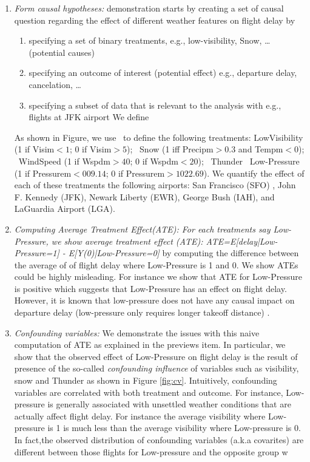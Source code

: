 \begin{enumerate}

  \item {\it Form causal hypotheses:} demonstration starts by creating a set of causal question regarding the effect of different weather features on flight delay by
    \begin{enumerate}
      \item specifying a set of binary treatments, e.g., low-visibility, Snow, \ldots (potential causes)
      \item specifying an outcome of interest (potential effect) e.g., departure delay, cancelation, \ldots
      \item specifying a subset of data that is relevant to the analysis with e.g., flights at JFK airport
      We define
\end{enumerate}

 As shown in Figure, we use \GSQL\ to define the following treatments:
 LowVisibility (1 if Visim$<1$; 0 if Visim$>5$); \
Snow (1 iff Precipm$>0.3$ and Tempm$<0$); \ WindSpeed (1 if
Wspdm$>40$; 0 if Wspdm$<20$); \  Thunder \ Low-Pressure (1 if Pressurem$<009.14$; 0 if Pressurem$>1022.69$). We quantify the effect of each of these treatments the following airports: San Francisco (SFO) , John F. Kennedy (JFK), Newark Liberty (EWR), George Bush (IAH), and LaGuardia Airport (LGA).

 \item {\it Computing Average Treatment Effect(ATE): For each treatments say Low-Pressure, we show {\em average treatment effect (ATE)}:  ATE=E[delay|Low-Pressure=1] - E[Y(0)|Low-Pressure=0]} by computing the difference between the average of of flight delay where Low-Pressure is 1 and 0. We show ATEs could be highly misleading. For instance we show that ATE for Low-Pressure is positive which suggests that Low-Pressure has an effect on flight delay. However, it is known that
  low-pressure does not have any causal impact on departure delay
     (low-pressure only requires longer takeoff distance)
     \cite{FAA08}. 

  \item {\it Confounding variables:} We demonstrate the issues with this naive computation of 
  ATE as explained in the previews item. In particular, we show that the observed  effect of Low-Pressure on flight delay  is  the result of presence of the so-called {\em  confounding influence} of
  variables such as visibility, snow and Thunder as shown in Figure \ref{fig:cv}.  Intuitively, confounding variables are correlated with both treatment and outcome. For instance, 
  Low-pressure is generally associated with unsettled weather conditions that are actually affect flight delay. For instance the average visibility where Low-pressure is 1 is much less than 
  the average visibility where Low-pressure is 0. In fact,the observed distribution of confounding variables (a.k.a covarites) are different between those flights for
   Low-pressure and the opposite group w
  


\end{enumerate}
